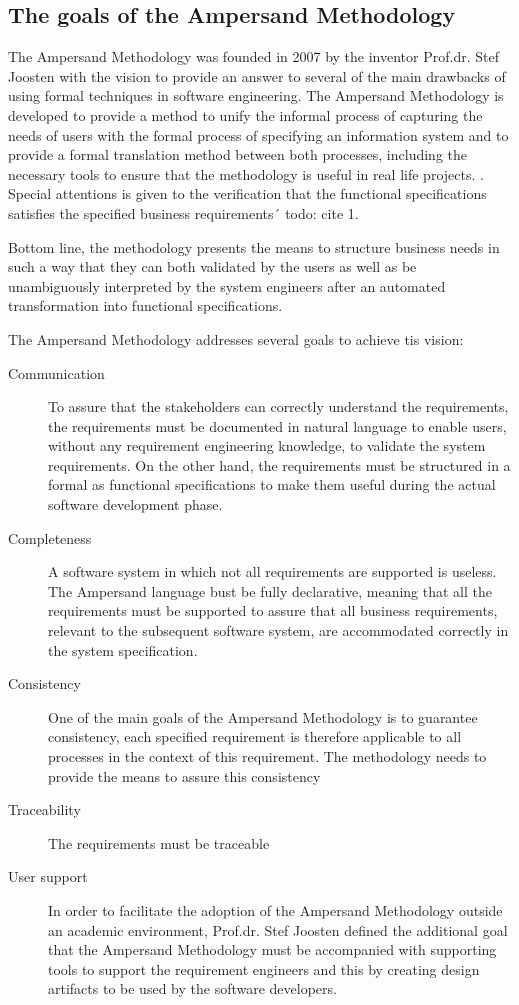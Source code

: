 \subsection{The goals of the Ampersand Methodology}
   
The Ampersand Methodology was founded in 2007 by the inventor Prof.dr. Stef Joosten with the vision to provide an answer to several of the main drawbacks of using formal techniques  in software engineering. The Ampersand Methodology is  developed to provide a method to unify the informal process of capturing the needs of users with the formal process of specifying an information system and to provide a formal translation method between both processes, including the necessary tools to ensure that the methodology is useful in real life projects. \cite{Joosten_derivingfunctional}. Special attentions is given to the verification that the functional specifications satisfies the specified business requirements´ todo: cite 1. 

Bottom line, the methodology presents the means to structure business needs in such a way that they can both validated by the users as well as be unambiguously interpreted by the system engineers after an automated transformation into functional specifications.

The Ampersand Methodology addresses several goals to achieve tis vision:
\begin{description}
	\item[Communication]  To assure that the stakeholders can correctly understand the requirements, the requirements must be documented in natural language to enable users, without any requirement engineering knowledge, to validate the system requirements. On the other hand, the requirements must be structured in a formal as functional specifications to make them useful during the actual software development phase. 
	\item[Completeness]A software system in which not all requirements are supported is useless. The Ampersand language bust be fully declarative, meaning that all the requirements must be supported to assure that all business requirements, relevant to the subsequent software system, are accommodated correctly in the system specification.
	\item[Consistency]One of the main goals of the Ampersand Methodology is to guarantee consistency, each specified requirement is therefore applicable to all processes in the context of this requirement. The methodology needs to provide the means to assure this consistency
	\item[Traceability] The requirements must be traceable 
	\item[User support] In order to facilitate the adoption of the Ampersand Methodology outside an academic environment, Prof.dr. Stef Joosten defined the additional goal that the Ampersand Methodology must be accompanied with supporting tools to support the requirement engineers and this by creating design artifacts to be used by the software developers.
\end{description}


